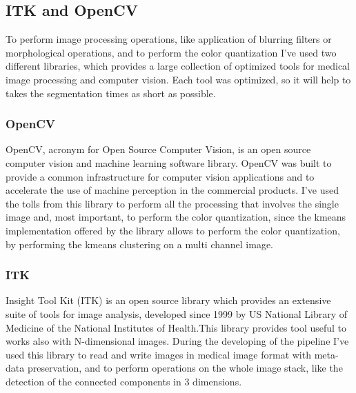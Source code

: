\documentclass{standalone}
\begin{document}
	
	\subsection{ITK and OpenCV}
	
	To perform image processing operations, like application of blurring filters or morphological operations, and to perform the color quantization I've used two different libraries, which provides a large collection of optimized tools for medical image processing and computer vision. Each tool was optimized, so it will help to takes the segmentation times as short as possible.
	
	\subsubsection*{OpenCV} 
	
	OpenCV, acronym for Open Source Computer Vision,  is an open source computer vision and machine learning software library. OpenCV was built to provide a common infrastructure for computer vision applications and to accelerate the use of machine perception in the commercial products.
	I've used the tolls from this library to perform all the processing that involves the single image and, most important, to perform the color quantization, since the kmeans implementation offered by the library allows to perform the color quantization, by performing the kmeans clustering on a multi channel image. 
	
	\subsubsection*{ITK} 
	
	Insight Tool Kit (ITK) is an open source library which provides an extensive suite of tools for image analysis, developed since 1999 by US National Library of Medicine of the National Institutes of Health.This library provides tool useful to works also with N-dimensional images. 
	During the developing of the pipeline I've used this library to read and write images in medical image format with meta-data preservation, and to perform operations on the whole image stack, like the detection of the connected components in 3 dimensions. 
	 
	
	 
\end{document}
